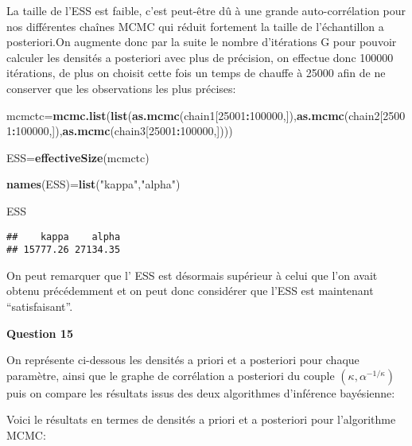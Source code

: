 \documentclass[
]{article}
\newenvironment{Shaded}{\begin{snugshade}}{\end{snugshade}}
\newcommand{\DecValTok}[1]{\textcolor[rgb]{0.00,0.00,0.81}{#1}}
\newcommand{\KeywordTok}[1]{\textcolor[rgb]{0.13,0.29,0.53}{\textbf{#1}}}
\newcommand{\NormalTok}[1]{#1}
\newcommand{\OperatorTok}[1]{\textcolor[rgb]{0.81,0.36,0.00}{\textbf{#1}}}
\newcommand{\StringTok}[1]{\textcolor[rgb]{0.31,0.60,0.02}{#1}}
\begin{document}
La taille de l'ESS est faible, c'est peut-être dû à une grande
auto-corrélation pour nos différentes chaînes MCMC qui réduit fortement
la taille de l'échantillon a posteriori.On augmente donc par la suite le
nombre d'itérations G pour pouvoir calculer les densités a posteriori
avec plus de précision, on effectue donc 100000 itérations, de plus on
choisit cette fois un temps de chauffe à 25000 afin de ne conserver que
les observations les plus précises:

\begin{Shaded}
\begin{Highlighting}[]
\NormalTok{mcmctc=}\KeywordTok{mcmc.list}\NormalTok{(}\KeywordTok{list}\NormalTok{(}\KeywordTok{as.mcmc}\NormalTok{(chain1[}\DecValTok{25001}\OperatorTok{:}\DecValTok{100000}\NormalTok{,]),}\KeywordTok{as.mcmc}\NormalTok{(chain2[}\DecValTok{25001}\OperatorTok{:}\DecValTok{100000}\NormalTok{,]),}\KeywordTok{as.mcmc}\NormalTok{(chain3[}\DecValTok{25001}\OperatorTok{:}\DecValTok{100000}\NormalTok{,])))}

\NormalTok{ESS=}\KeywordTok{effectiveSize}\NormalTok{(mcmctc)}

\KeywordTok{names}\NormalTok{(ESS)=}\KeywordTok{list}\NormalTok{(}\StringTok{"kappa"}\NormalTok{,}\StringTok{"alpha"}\NormalTok{)}

\NormalTok{ESS}
\end{Highlighting}
\end{Shaded}

\begin{verbatim}
##    kappa    alpha 
## 15777.26 27134.35
\end{verbatim}

On peut remarquer que l' ESS est désormais supérieur à celui que l'on
avait obtenu précédemment et on peut donc considérer que l'ESS est
maintenant ``satisfaisant''.

\textbf{Question 15}

On représente ci-dessous les densités a priori et a posteriori pour
chaque paramètre, ainsi que le graphe de corrélation a posteriori du
couple \((\kappa,\alpha^{-1/\kappa})\) puis on compare les résultats
issus des deux algorithmes d'inférence bayésienne:

Voici le résultats en termes de densités a priori et a posteriori pour
l'algorithme MCMC:
\end{document}
